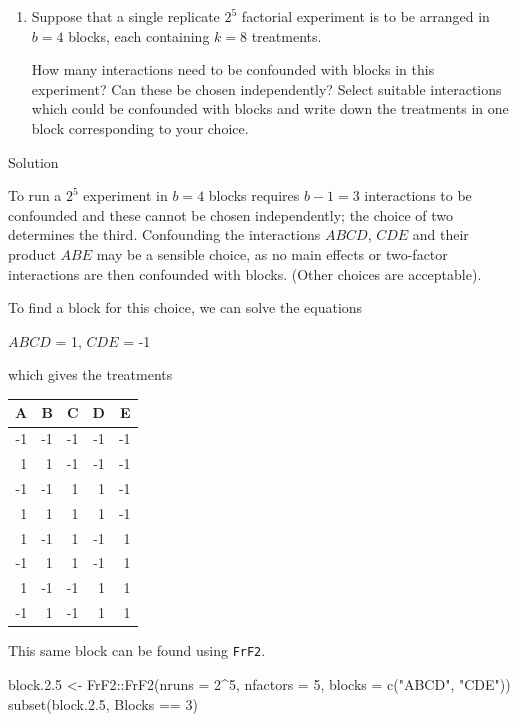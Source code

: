 \documentclass[
]{book}
\newenvironment{Shaded}{\begin{snugshade}}{\end{snugshade}}
\newcommand{\AttributeTok}[1]{\textcolor[rgb]{0.77,0.63,0.00}{#1}}
\newcommand{\DecValTok}[1]{\textcolor[rgb]{0.00,0.00,0.81}{#1}}
\newcommand{\FloatTok}[1]{\textcolor[rgb]{0.00,0.00,0.81}{#1}}
\newcommand{\FunctionTok}[1]{\textcolor[rgb]{0.00,0.00,0.00}{#1}}
\newcommand{\NormalTok}[1]{#1}
\newcommand{\OtherTok}[1]{\textcolor[rgb]{0.56,0.35,0.01}{#1}}
\newcommand{\SpecialCharTok}[1]{\textcolor[rgb]{0.00,0.00,0.00}{#1}}
\newcommand{\StringTok}[1]{\textcolor[rgb]{0.31,0.60,0.02}{#1}}
\theoremstyle{definition}
\theoremstyle{definition}
\theoremstyle{definition}
\theoremstyle{definition}
\theoremstyle{remark}
\begin{document}
\begin{enumerate}
\def\labelenumi{\arabic{enumi}.}
\item
  Suppose that a single replicate \(2^5\) factorial experiment is to be arranged in \(b=4\) blocks, each containing \(k=8\) treatments.

  How many interactions need to be confounded with blocks in this experiment? Can these be chosen independently? Select suitable interactions which could be confounded with blocks and write down the treatments in one block corresponding to your choice.
\end{enumerate}

Solution

To run a \(2^5\) experiment in \(b=4\) blocks requires \(b-1=3\) interactions to be confounded and these cannot be chosen independently; the choice of two determines the third.
Confounding the interactions \(ABCD\), \(CDE\) and their product \(ABE\) may be a sensible choice, as no main effects or two-factor interactions are then confounded with blocks. (Other choices are acceptable).

To find a block for this choice, we can solve the equations

\(ABCD\) = 1, \(CDE\) = -1

which gives the treatments

\begin{longtable}[]{@{}rrrrr@{}}
\toprule()
A & B & C & D & E \\
\midrule()
\endhead
-1 & -1 & -1 & -1 & -1 \\
1 & 1 & -1 & -1 & -1 \\
-1 & -1 & 1 & 1 & -1 \\
1 & 1 & 1 & 1 & -1 \\
1 & -1 & 1 & -1 & 1 \\
-1 & 1 & 1 & -1 & 1 \\
1 & -1 & -1 & 1 & 1 \\
-1 & 1 & -1 & 1 & 1 \\
\bottomrule()
\end{longtable}

This same block can be found using \texttt{FrF2}.

\begin{Shaded}
\begin{Highlighting}[]
\NormalTok{block.}\FloatTok{2.5} \OtherTok{\textless{}{-}}\NormalTok{ FrF2}\SpecialCharTok{::}\FunctionTok{FrF2}\NormalTok{(}\AttributeTok{nruns =} \DecValTok{2}\SpecialCharTok{\^{}}\DecValTok{5}\NormalTok{, }\AttributeTok{nfactors =} \DecValTok{5}\NormalTok{, }\AttributeTok{blocks =} \FunctionTok{c}\NormalTok{(}\StringTok{"ABCD"}\NormalTok{, }\StringTok{"CDE"}\NormalTok{))}
\FunctionTok{subset}\NormalTok{(block.}\FloatTok{2.5}\NormalTok{, Blocks }\SpecialCharTok{==} \DecValTok{3}\NormalTok{)}
\end{Highlighting}
\end{Shaded}
\end{document}
